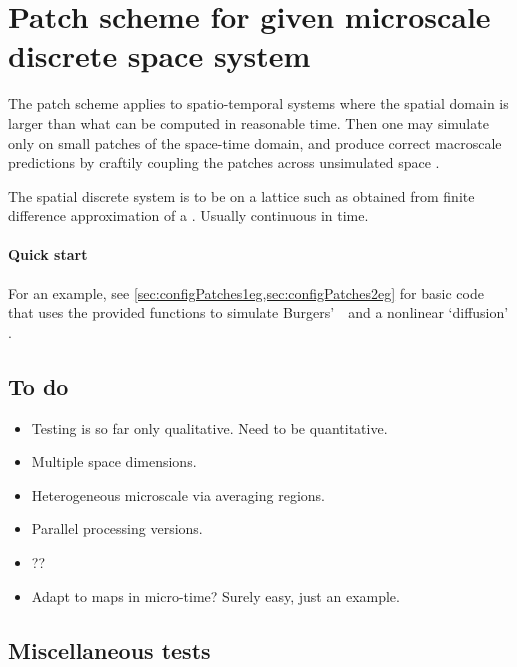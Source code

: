 \section{Patch scheme for given microscale discrete space system}
\label{sec:patch}
\localtableofcontents

The patch scheme applies to spatio-temporal systems where
the spatial domain is larger than what can be computed in
reasonable time. Then one may simulate only on small patches
of the space-time domain, and produce correct macroscale
predictions by craftily coupling the patches across
unsimulated space \cite[e.g.]{Hyman2005, Samaey03b,
Samaey04, Roberts06d, Liu2015}.

The spatial discrete system is to be on a lattice such as
obtained from finite difference approximation of a \pde.
Usually continuous in time.

\paragraph{Quick start}
For an example, see \cref{sec:configPatches1eg,sec:configPatches2eg}  for basic code that uses the provided functions to simulate Burgers'~\pde\ and a nonlinear `diffusion' \pde.














\begin{body}
\subsection{To do}
\begin{itemize}
\item Testing is so far only qualitative.  Need to be quantitative.
\item Multiple space dimensions.
\item Heterogeneous microscale via averaging regions.
\item Parallel processing versions.
\item ??
\item Adapt to maps in micro-time?  Surely easy, just an example.
\end{itemize}


\subsection{Miscellaneous tests}



\end{body}
